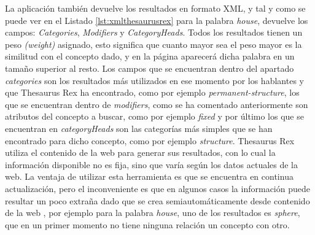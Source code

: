 La aplicación también devuelve los resultados en formato XML, y tal y como se puede ver en el Listado \ref{lst:xmlthesaurusrex} para la palabra \textit{house}, devuelve los campos: \textit{Categories}, \textit{Modifiers} y \textit{CategoryHeads}. Todos los resultados tienen un peso \textit{(weight)} asignado, esto significa que cuanto mayor sea el peso mayor es la similitud con el concepto dado, y en la página aparecerá dicha palabra en un tamaño superior al resto. 
Los campos que se encuentran dentro del apartado \textit{categories} son los resultados más utilizados en ese momento por los hablantes y que Thesaurus Rex ha encontrado, como por ejemplo \textit{permanent-structure}, los que se encuentran dentro de  \textit{modifiers}, como se ha comentado anteriormente son atributos del concepto a buscar, como por ejemplo \textit{fixed}  y por último los que se encuentran en \textit{categoryHeads} son las categorías más simples que se han encontrado para dicho concepto, como por ejemplo \textit{structure}.
Thesaurus Rex utiliza el contenido de la web para generar sus resultados, con lo cual la información disponible no es fija, sino que varía según los datos actuales de la web.
La ventaja de utilizar esta herramienta es que se encuentra en continua actualización, pero el inconveniente es que en algunos casos la información puede resultar un poco extraña dado que se crea semiautomáticamente desde contenido de la web \citep{VealeT2013}, por ejemplo para la palabra \textit{house}, uno de los resultados es \textit{sphere}, que en un primer momento no tiene ninguna relación un concepto con otro.


